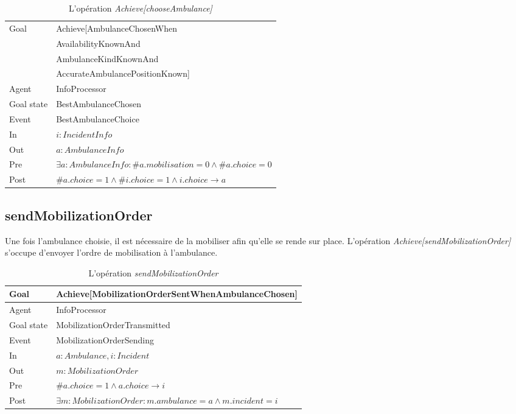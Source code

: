 	\begin{table}[!h] \centering
		\begin{tabularx}{\textwidth}{|l|X|} \hline
			Goal & Achieve[AmbulanceChosenWhen\\  %
				& AvailabilityKnownAnd \\ 
				& AmbulanceKindKnownAnd \\ 
				& AccurateAmbulancePositionKnown] \\ \hline
			Agent & InfoProcessor \\ \hline
			Goal state & BestAmbulanceChosen \\ \hline
			Event & BestAmbulanceChoice \\ \hline
			In & $i: IncidentInfo$ \\ \hline
			Out & $a: AmbulanceInfo$ \\ \hline
			Pre & $\exists a: AmbulanceInfo : \#a.mobilisation = 0 \wedge \#a.choice = 0$ \\ \hline
			Post & $\#a.choice = 1 \wedge \#i.choice = 1 \wedge i.choice \rightarrow a$ \\ \hline
		\end{tabularx}
		\caption{L'opération \textit{Achieve[chooseAmbulance]}}\label{tab:op3}
	\end{table}

\subsection{sendMobilizationOrder}

	Une fois l'ambulance choisie, il est nécessaire de la mobiliser afin 
	qu'elle se rende sur place. L'opération \textit{Achieve[sendMobilizationOrder]}
	s'occupe d'envoyer l'ordre de mobilisation à l'ambulance.
	
	
	\begin{table}[!h] \centering
		\begin{tabularx}{\textwidth}{|l|X|} \hline
			Goal & Achieve[MobilizationOrderSentWhenAmbulanceChosen] \\ \hline
			Agent & InfoProcessor \\ \hline
			Goal state & MobilizationOrderTransmitted \\ \hline
			Event & MobilizationOrderSending \\ \hline
			In & $a: Ambulance, i: Incident$ \\ \hline %
			Out & $m: MobilizationOrder$ \\ \hline
			Pre & $\#a.choice = 1 \wedge a.choice \rightarrow i$ \\ \hline
			Post & $\exists m: MobilizationOrder : m.ambulance = a \wedge m.incident = i$ \\ \hline %
		\end{tabularx}
		\caption{L'opération \textit{sendMobilizationOrder}}\label{tab:op4}
	\end{table}
